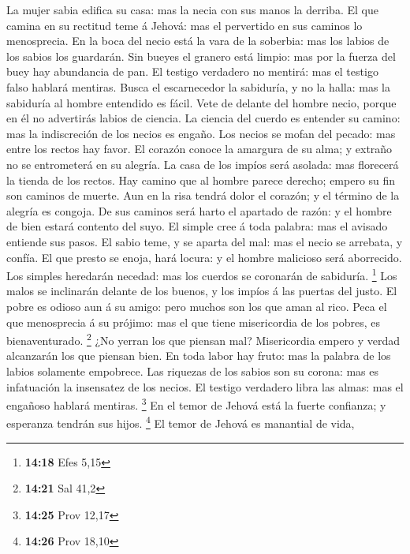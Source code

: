  La mujer sabia edifica su casa: mas la necia con sus manos
la derriba.  El que camina en su rectitud teme á Jehová: mas
el pervertido en sus caminos lo menosprecia.  En la boca del
necio está la vara de la soberbia: mas los labios de los sabios los
guardarán.  Sin bueyes el granero está limpio: mas por la
fuerza del buey hay abundancia de pan.  El testigo verdadero
no mentirá: mas el testigo falso hablará mentiras.  Busca el
escarnecedor la sabiduría, y no la halla: mas la sabiduría al hombre
entendido es fácil.  Vete de delante del hombre necio,
porque en él no advertirás labios de ciencia.  La ciencia
del cuerdo es entender su camino: mas la indiscreción de los necios es
engaño.  Los necios se mofan del pecado: mas entre los
rectos hay favor.  El corazón conoce la amargura de su
alma; y extraño no se entrometerá en su alegría.  La casa
de los impíos será asolada: mas florecerá la tienda de los rectos.
 Hay camino que al hombre parece derecho; empero su fin son
caminos de muerte.  Aun en la risa tendrá dolor el corazón;
y el término de la alegría es congoja.  De sus caminos será
harto el apartado de razón: y el hombre de bien estará contento del
suyo.  El simple cree á toda palabra: mas el avisado
entiende sus pasos.  El sabio teme, y se aparta del mal:
mas el necio se arrebata, y confía.  El que presto se
enoja, hará locura: y el hombre malicioso será aborrecido. 
Los simples heredarán necedad: mas los cuerdos se coronarán de
sabiduría. \footnote{\textbf{14:18} Efes 5,15}  Los malos
se inclinarán delante de los buenos, y los impíos á las puertas del
justo.  El pobre es odioso aun á su amigo: pero muchos son
los que aman al rico.  Peca el que menosprecia á su
prójimo: mas el que tiene misericordia de los pobres, es bienaventurado.
\footnote{\textbf{14:21} Sal 41,2}  ¿No yerran los que
piensan mal? Misericordia empero y verdad alcanzarán los que piensan
bien.  En toda labor hay fruto: mas la palabra de los
labios solamente empobrece.  Las riquezas de los sabios son
su corona: mas es infatuación la insensatez de los necios. 
El testigo verdadero libra las almas: mas el engañoso hablará mentiras.
\footnote{\textbf{14:25} Prov 12,17}  En el temor de Jehová
está la fuerte confianza; y esperanza tendrán sus hijos. \footnote{\textbf{14:26}
  Prov 18,10}  El temor de Jehová es manantial de vida,
